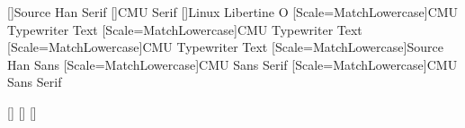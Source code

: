 \usepackage[russian,croatian,japanese,shorthands=off,provide*=*]{babel}
[]{Source Han Serif}
[]{CMU Serif}
[]{Linux Libertine O}
[Scale=MatchLowercase]{CMU Typewriter Text}
[Scale=MatchLowercase]{CMU Typewriter Text}
[Scale=MatchLowercase]{CMU Typewriter Text}
[Scale=MatchLowercase]{Source Han Sans}
[Scale=MatchLowercase]{CMU Sans Serif}
[Scale=MatchLowercase]{CMU Sans Serif}
\usepackage{xeCJK}
[]
[]
[]
